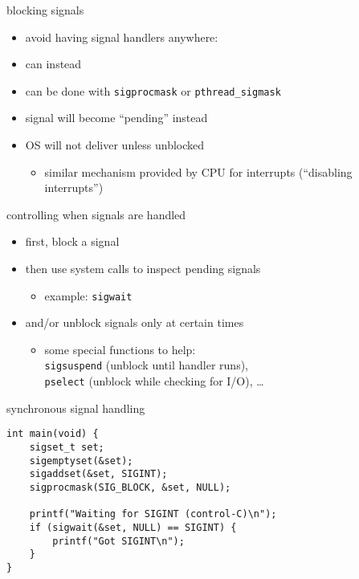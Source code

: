 \begin{frame}{blocking signals}
\begin{itemize}
\item avoid having signal handlers anywhere:
\item can instead 
\vspace{.5cm}
\item can be done with {\tt sigprocmask} or {\tt pthread\_sigmask} 
\item signal will become ``pending'' instead
\item OS will not deliver unless unblocked
    \begin{itemize}
    \item similar mechanism provided by CPU for interrupts (``disabling interrupts'')
    \end{itemize}
\end{itemize}
\end{frame}

\begin{frame}{controlling when signals are handled}
\begin{itemize}
\item first, block a signal
\item then use system calls to inspect pending signals
    \begin{itemize}
    \item example: {\tt sigwait}
    \end{itemize}
\item and/or unblock signals only at certain times
    \begin{itemize}
        \item some special functions to help: \\ {\tt sigsuspend} (unblock until handler runs), \\ {\tt pselect} (unblock while checking for I/O), \ldots
    \end{itemize}
\end{itemize}
\end{frame}

\begin{frame}[fragile,label=syncSig]{synchronous signal handling}
\lstset{language=C,style=small}
\begin{lstlisting}
int main(void) {
    sigset_t set;
    sigemptyset(&set);
    sigaddset(&set, SIGINT);
    sigprocmask(SIG_BLOCK, &set, NULL);
    
    printf("Waiting for SIGINT (control-C)\n"); 
    if (sigwait(&set, NULL) == SIGINT) {
        printf("Got SIGINT\n");
    }
}
\end{lstlisting}
\end{frame}

